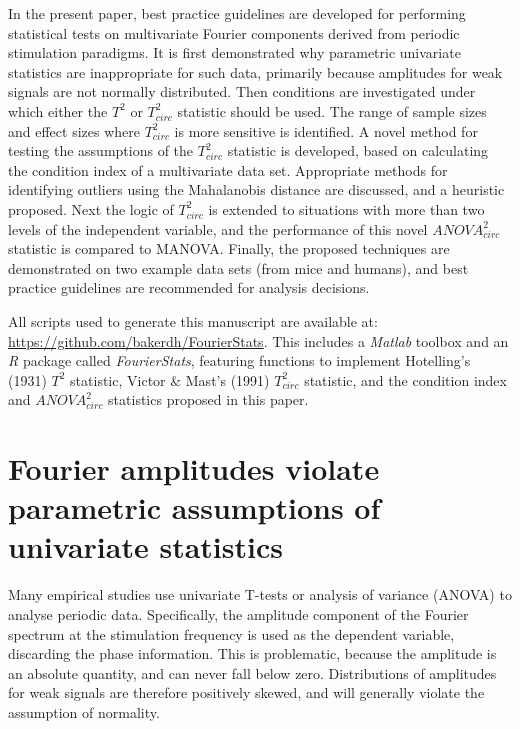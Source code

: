 \documentclass[]{article}
\begin{document}
In the present paper, best practice guidelines are developed for performing statistical tests on multivariate Fourier components derived from periodic stimulation paradigms. It is first demonstrated why parametric univariate statistics are inappropriate for such data, primarily because amplitudes for weak signals are not normally distributed. Then conditions are investigated under which either the \(T^2\) or \(T^2_{circ}\) statistic should be used. The range of sample sizes and effect sizes where \(T^2_{circ}\) is more sensitive is identified. A novel method for testing the assumptions of the \(T^2_{circ}\) statistic is developed, based on calculating the condition index of a multivariate data set. Appropriate methods for identifying outliers using the Mahalanobis distance are discussed, and a heuristic proposed. Next the logic of \(T^2_{circ}\) is extended to situations with more than two levels of the independent variable, and the performance of this novel \(ANOVA^2_{circ}\) statistic is compared to MANOVA. Finally, the proposed techniques are demonstrated on two example data sets (from mice and humans), and best practice guidelines are recommended for analysis decisions.

All scripts used to generate this manuscript are available at: \url{https://github.com/bakerdh/FourierStats}. This includes a \emph{Matlab} toolbox and an \emph{R} package called \emph{FourierStats}, featuring functions to implement Hotelling's (1931) \(T^2\) statistic, Victor \& Mast's (1991) \(T^2_{circ}\) statistic, and the condition index and \(ANOVA^2_{circ}\) statistics proposed in this paper.

\hypertarget{fourier-amplitudes-violate-parametric-assumptions-of-univariate-statistics}{%
\section{Fourier amplitudes violate parametric assumptions of univariate statistics}\label{fourier-amplitudes-violate-parametric-assumptions-of-univariate-statistics}}

Many empirical studies use univariate T-tests or analysis of variance (ANOVA) to analyse periodic data. Specifically, the amplitude component of the Fourier spectrum at the stimulation frequency is used as the dependent variable, discarding the phase information. This is problematic, because the amplitude is an absolute quantity, and can never fall below zero. Distributions of amplitudes for weak signals are therefore positively skewed, and will generally violate the assumption of normality.
\end{document}
